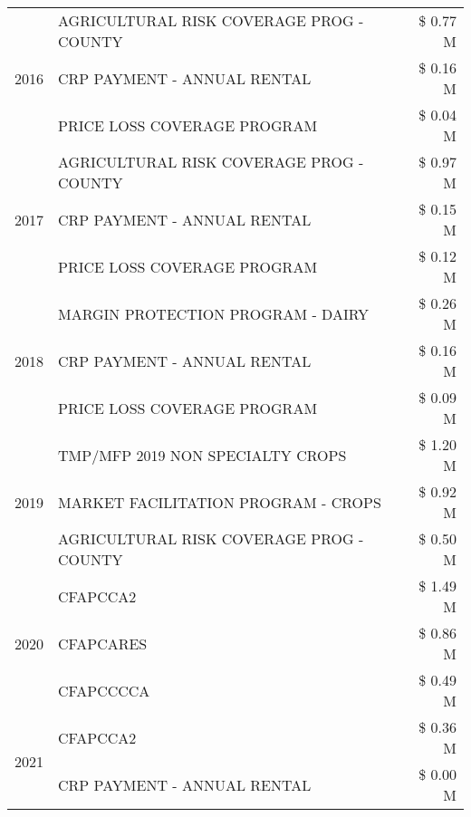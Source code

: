 \begin{tabular}{llr}
\cline{1-3}
\multirow[t]{3}{*}{2016} & AGRICULTURAL RISK COVERAGE PROG - COUNTY & \$ 0.77 M \\
 & CRP PAYMENT - ANNUAL RENTAL & \$ 0.16 M \\
 & PRICE LOSS COVERAGE PROGRAM & \$ 0.04 M \\
\cline{1-3}
\multirow[t]{3}{*}{2017} & AGRICULTURAL RISK COVERAGE PROG - COUNTY & \$ 0.97 M \\
 & CRP PAYMENT - ANNUAL RENTAL & \$ 0.15 M \\
 & PRICE LOSS COVERAGE PROGRAM & \$ 0.12 M \\
\cline{1-3}
\multirow[t]{3}{*}{2018} & MARGIN PROTECTION PROGRAM - DAIRY & \$ 0.26 M \\
 & CRP PAYMENT - ANNUAL RENTAL & \$ 0.16 M \\
 & PRICE LOSS COVERAGE PROGRAM & \$ 0.09 M \\
\cline{1-3}
\multirow[t]{3}{*}{2019} & TMP/MFP 2019 NON SPECIALTY CROPS & \$ 1.20 M \\
 & MARKET FACILITATION PROGRAM - CROPS & \$ 0.92 M \\
 & AGRICULTURAL RISK COVERAGE PROG - COUNTY & \$ 0.50 M \\
\cline{1-3}
\multirow[t]{3}{*}{2020} & CFAPCCA2 & \$ 1.49 M \\
 & CFAPCARES & \$ 0.86 M \\
 & CFAPCCCCA & \$ 0.49 M \\
\cline{1-3}
\multirow[t]{2}{*}{2021} & CFAPCCA2 & \$ 0.36 M \\
 & CRP PAYMENT - ANNUAL RENTAL & \$ 0.00 M \\
\cline{1-3}
\bottomrule
\end{tabular}
